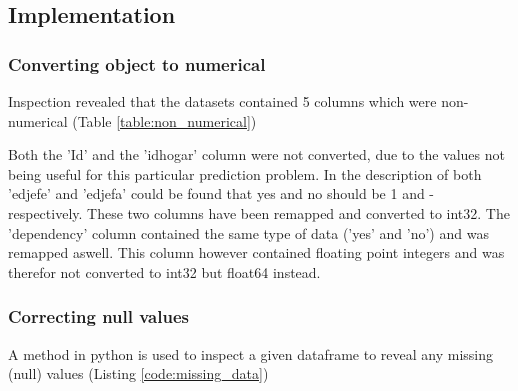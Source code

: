 \documentclass[preprint,12pt]{elsarticle}
\begin{document}
\subsection{Implementation}
\label{ss:implementation}
\subsubsection{Converting object to numerical}
\label{sss:conversion}
Inspection revealed that the datasets contained 5 columns which were non-numerical (Table \ref{table:non_numerical})\\

\begin{table}[]
\caption{Object types in the dataset}
\label{table:non_numerical}
\end{table}

Both the 'Id' and the 'idhogar' column were not converted, due to the values not being useful for this particular prediction problem. In the description of both 'edjefe' and 'edjefa' could be found that yes and no should be 1 and - respectively. These two columns have been remapped and converted to int32. The 'dependency' column contained the same type of data ('yes' and 'no') and was remapped aswell. This column however contained floating point integers and was therefor not converted to int32 but float64 instead.

\subsubsection{Correcting null values}
\label{sss:correct_null}
A method in python is used to inspect a given dataframe to reveal any missing (null) values (Listing \ref{code:missing_data})
\end{document}
